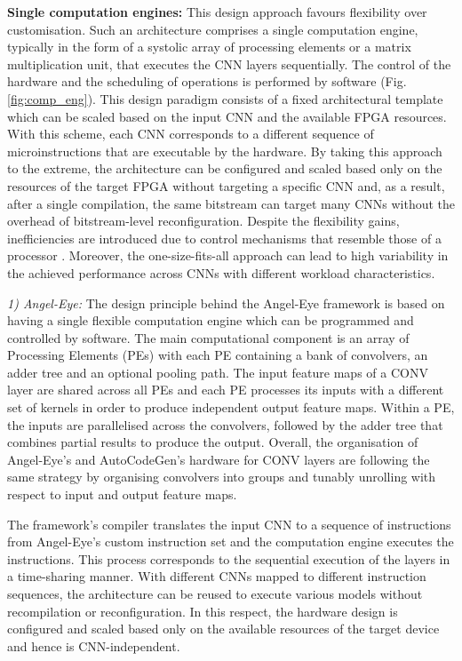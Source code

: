 \documentclass[format=acmsmall, review=false, screen=true]{acmart}
\begin{document}
\textbf{Single computation engines:}
This design approach favours flexibility over customisation. Such an architecture comprises a single computation engine, typically in the form of a systolic array of processing elements or a matrix multiplication unit, that executes the CNN layers sequentially. The control of the hardware and the scheduling of operations is performed by software (Fig. \ref{fig:comp_eng}). %
This design paradigm consists of a fixed architectural template which can be scaled based on the input CNN and the available FPGA resources.
With this scheme, each CNN corresponds to a different sequence of microinstructions that are executable by the hardware. By taking this approach to the extreme, the architecture can be configured and scaled based only on the resources of the target FPGA without targeting a specific CNN and, as a result, after a single compilation, the same bitstream can target many CNNs without the overhead of bitstream-level reconfiguration. Despite the flexibility gains, inefficiencies are introduced due to control mechanisms that resemble those of a processor \cite{Hameed_2010}. Moreover, the one-size-fits-all approach can lead to high variability in the achieved performance across CNNs with different workload characteristics.


\textit{1) Angel-Eye:}
The design principle behind the Angel-Eye framework is based on having a single flexible computation engine which can be programmed and controlled by software. The main computational component is an array of Processing Elements (PEs) with each PE containing a bank of convolvers, an adder tree and an optional pooling path. The input feature maps of a CONV layer are shared across all PEs and each PE processes its inputs with a different set of kernels in order to produce independent output feature maps. Within a PE, the inputs are parallelised across the convolvers, followed by the adder tree that combines partial results to produce the output. {\color{black}Overall, the organisation of Angel-Eye's and AutoCodeGen's hardware for CONV layers are following the same strategy by organising convolvers into groups and tunably unrolling with respect to input and output feature maps.}

The framework's compiler translates the input CNN %
to a sequence of instructions from Angel-Eye's custom instruction set and the computation engine executes the instructions. This process corresponds to the sequential execution of the layers in a time-sharing manner. 
With different CNNs mapped to different instruction sequences, the architecture can be reused to execute various models without recompilation or reconfiguration. In this respect, the hardware design is configured and scaled based only on the available resources of the target device and hence is CNN-independent.
\end{document}
